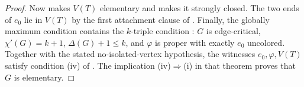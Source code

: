 \begin{proof}
Now  makes $V(T)$ elementary and
 makes it strongly closed.  The
two ends of $e_0$ lie in $V(T)$ by the first attachment clause of
.  Finally, the globally maximum condition contains
the $k$-triple condition : $G$ is edge-critical,
$\chi'(G)=k+1$, $\Delta(G)+1\leq k$, and $\varphi$ is proper with exactly
$e_0$ uncolored.  Together with the stated no-isolated-vertex hypothesis,
the witnesses $e_0,\varphi,V(T)$ satisfy condition (iv) of
.  The implication (iv)$\Rightarrow$(i) in that theorem
proves that $G$ is elementary.
\end{proof}

